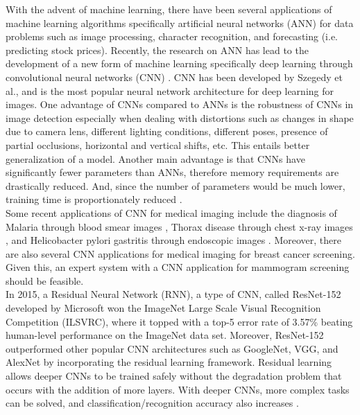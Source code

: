 	With the advent of machine learning, there have been several applications of machine learning algorithms specifically artificial neural networks (ANN) for data problems such as image processing, character recognition, and forecasting (i.e. predicting stock prices). Recently, the research on ANN has lead to the development of a new form of machine learning specifically deep learning through convolutional neural networks (CNN) \cite{applicationML}. CNN has been developed by Szegedy et al., and is the most popular neural network architecture for deep learning for images. One advantage of CNNs compared to ANNs is the robustness of CNNs in image detection especially when dealing with distortions such as changes in shape due to camera lens, different lighting conditions, different poses, presence of partial occlusions, horizontal and vertical shifts, etc. This entails better generalization of a model. Another main advantage is that CNNs have significantly fewer parameters than ANNs, therefore memory requirements are drastically reduced. And, since the number of parameters would be much lower, training time is proportionately reduced \cite{ANNvsCNN}. \\

	Some recent applications of CNN for medical imaging include the diagnosis of Malaria through blood smear images \cite{malariablood}, Thorax disease through chest x-ray images \cite{thorax}, and Helicobacter pylori gastritis through endoscopic images \cite{helicobacter}. Moreover, there are also several CNN applications for medical imaging for breast cancer screening. Given this, an expert system with a CNN application for mammogram screening should be feasible. \\

	In 2015, a Residual Neural Network (RNN), a type of CNN, called ResNet-152 developed by Microsoft won the ImageNet Large Scale Visual Recognition Competition (ILSVRC), where it topped with a top-5 error rate of 3.57\% beating human-level performance on the ImageNet data set. Moreover, ResNet-152 outperformed other popular CNN architectures such as GoogleNet, VGG, and AlexNet by incorporating the residual learning framework. Residual learning allows deeper CNNs to be trained safely without the degradation problem that occurs with the addition of more layers. With deeper CNNs, more complex tasks can be solved, and classification/recognition accuracy also increases \cite{Resnet}. \\

